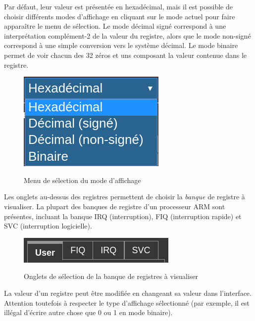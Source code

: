 \documentclass{tufte-handout}
\begin{document}
Par défaut, leur valeur est présentée en hexadécimal, mais il est possible de choisir différents modes d'affichage en cliquant sur le mode actuel pour faire apparaître le menu de sélection. Le mode décimal signé correspond à une interprétation complément-2 de la valeur du registre, alors que le mode non-signé correspond à une simple conversion vers le système décimal. Le mode binaire permet de voir chacun des 32 zéros et uns composant la valeur contenue dans le registre.
\begin{figure}[h!]
\raggedleft
\includegraphics[width=0.4\linewidth]{pics/registres_format.png}
\label{f:regformat}
\caption{Menu de sélection du mode d'affichage}
\end{figure}

Les onglets au-dessus des registres permettent de choisir la \textit{banque} de registre à visualiser. La plupart des banques de registre d'un processeur ARM sont présentes, incluant la banque IRQ (interruption), FIQ (interruption rapide) et SVC (interruption logicielle).
\begin{figure}[h!]
\raggedleft
\includegraphics[width=0.6\linewidth]{pics/registres_banques.png}
\label{f:regbank}
\caption{Onglets de sélection de la banque de registres à visualiser}
\end{figure}

La valeur d'un registre peut être modifiée en changeant sa valeur dans l'interface. Attention toutefois à respecter le type d'affichage sélectionné (par exemple, il est illégal d'écrire autre chose que 0 ou 1 en mode binaire).
\end{document}

